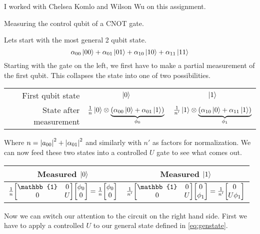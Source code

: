 \documentclass[boxes,pages]{homework}
\begin{document}
\noindent
I worked with Chelsea Komlo and Wilson Wu on this assignment.

\begin{problem}
Measuring the control qubit of a CNOT gate.
\end{problem}

\begin{solution}
	Lets start with the most general 2 qubit state.
	\begin{equation}\label{eq:genstate}
		\alpha_{00}\ket{00} + \alpha_{01}\ket{01} + \alpha_{10}\ket{10} + \alpha_{11}\ket{11}
	\end{equation}
	Starting with the gate on the left, we first have to make a partial measurement of the first qubit. This collapses the state into one of two possibilities.
	\begin{center}
		\begin{tabular}{ r c | c }
			First qubit state       & $\ket{0}$                                                                                      & $\ket{1}$                                                                                       \\
			State after measurement & $\frac{1}{n}\ket{0}\otimes\underbrace{\qty(\alpha_{00}\ket{0} + \alpha_{01}\ket{1})}_{\phi_0}$ & $\frac{1}{n'}\ket{1}\otimes\underbrace{\qty(\alpha_{10}\ket{0} + \alpha_{11}\ket{1})}_{\phi_1}$
		\end{tabular}
	\end{center}
	Where $n = \abs{a_{00}}^2 + \abs{\alpha_{01}}^2$ and similarly with $n'$ as factors for normalization. We can now feed these two states into a controlled $U$ gate to see what comes out.
	\begin{center}
		\begin{tabular}{c@{\hskip 0.75in} c}
			Measured $\ket{0}$ & Measured $\ket{1}$ \\ \toprule
			$\frac{1}{n}\mqty[\mathbb{1} & 0 \\ 0 & U]\mqty[\phi_0 \\ 0] = \frac{1}{n}\mqty[\phi_0 \\ 0]$ & $\frac{1}{n'}\mqty[\mathbb{1} & 0 \\ 0 & U]\mqty[0 \\ \phi_1] = \frac{1}{n'}\mqty[0 \\ U\phi_1]$
		\end{tabular}
	\end{center}
	Now we can switch our attention to the circuit on the right hand side. First we have to apply a controlled $U$ to our general state defined in \cref{eq:genstate}.

\end{solution}
\end{document}
